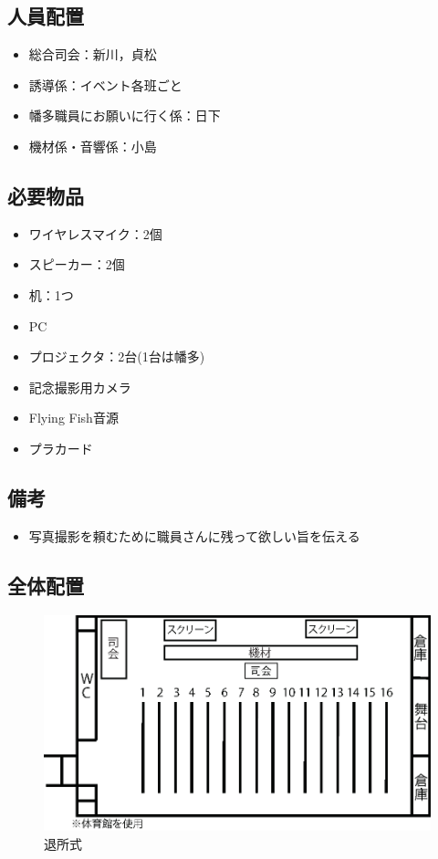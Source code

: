 \subsection{人員配置}
\begin{itemize}
\item 総合司会：新川，貞松
\item 誘導係：イベント各班ごと
\item 幡多職員にお願いに行く係：日下
\item 機材係・音響係：小島
\end{itemize}


\subsection{必要物品}
\begin{itemize}
\item ワイヤレスマイク：2個
\item スピーカー：2個
\item 机：1つ
\item PC
\item プロジェクタ：2台(1台は幡多)
\item 記念撮影用カメラ
\item Flying Fish音源
\item プラカード
\end{itemize}
\subsection{備考}
\begin{itemize}
\item 写真撮影を頼むために職員さんに残って欲しい旨を伝える
\end{itemize}

\subsection{全体配置}
\begin{figure}[htbp]
  \begin{center}
  \includegraphics[width = 15cm]{./24/hyousyou.eps}
  \caption{退所式}
  \end{center}
\end{figure}

%
